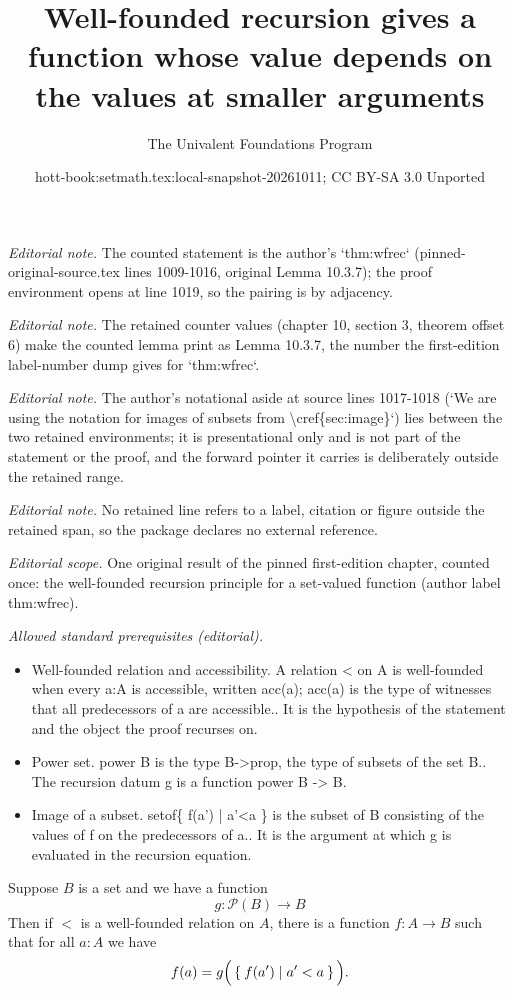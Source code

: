 \documentclass[10pt,a4paper]{article}
\title{Well-founded recursion gives a function whose value depends on the values at smaller arguments}
\author{The Univalent Foundations Program}
\date{hott-book:setmath.tex:local-snapshot-20261011; CC BY-SA 3.0 Unported}
\newcounter{chapter}
\let\setof\Set    %
\newcommand{\power}[1]{\mathcal{P}(#1)} %
\theoremstyle{definition}
\theoremstyle{remark}
\numberwithin{equation}{section}
\begin{document}
\maketitle
\setcounter{chapter}{10}
\setcounter{section}{3}
\setcounter{thm}{6}
\noindent\textit{Editorial note.} The counted statement is the author's `thm:wfrec` (pinned-original-source.tex lines 1009-1016, original Lemma 10.3.7); the proof environment opens at line 1019, so the pairing is by adjacency.\par\medskip
\noindent\textit{Editorial note.} The retained counter values (chapter 10, section 3, theorem offset 6) make the counted lemma print as Lemma 10.3.7, the number the first-edition label-number dump gives for `thm:wfrec`.\par\medskip
\noindent\textit{Editorial note.} The author's notational aside at source lines 1017-1018 (`We are using the notation for images of subsets from \textbackslash{}cref\{sec:image\}`) lies between the two retained environments; it is presentational only and is not part of the statement or the proof, and the forward pointer it carries is deliberately outside the retained range.\par\medskip
\noindent\textit{Editorial note.} No retained line refers to a label, citation or figure outside the retained span, so the package declares no external reference.\par\medskip
\noindent\textit{Editorial scope.} One original result of the pinned first-edition chapter, counted once: the well-founded recursion principle for a set-valued function (author label thm:wfrec).\par\medskip
\noindent\textit{Allowed standard prerequisites (editorial).}\begin{itemize}
\item Well-founded relation and accessibility. A relation < on A is well-founded when every a:A is accessible, written acc(a); acc(a) is the type of witnesses that all predecessors of a are accessible.. It is the hypothesis of the statement and the object the proof recurses on.
\item Power set. power B is the type B->prop, the type of subsets of the set B.. The recursion datum g is a function power B -> B.
\item Image of a subset. setof\{ f(a') | a'<a \} is the subset of B consisting of the values of f on the predecessors of a.. It is the argument at which g is evaluated in the recursion equation.
\end{itemize}\medskip
\begin{lem}\label{thm:wfrec}
  Suppose $B$ is a set and we have a function
  \[ g : \power B \to B \]
  Then if $<$ is a well-founded relation on $A$, there is a function $f:A\to B$ such that for all $a:A$ we have
  \begin{equation*}
    f(a) = g\Big(\setof{ f(a') | a'<a }\Big).
  \end{equation*}
\end{lem}
\end{document}
